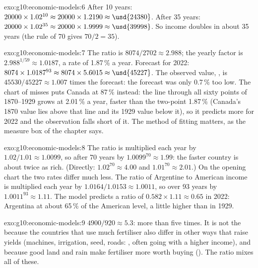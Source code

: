 \begin{solution}{exo:g10:economic-models:6}
After 10 years: $20000 \times 1.02^{10} \approx 20000 \times 1.2190 \approx \usd{24380}$. After 35
years: $20000 \times 1.02^{35} \approx 20000 \times 1.9999 \approx \usd{39998}$. So income doubles in
about 35 years (the rule of 70 gives $70/2 = 35$).
\end{solution}

\begin{solution}{exo:g10:economic-models:7}
The ratio is $8074/2702 \approx 2.988$; the yearly factor is $2.988^{1/59} \approx 1.0187$, a rate of
1.87\,\% a year. Forecast for 2022: $8074 \times 1.0187^{93} \approx 8074 \times 5.6015 \approx
\usd{45227}$. The observed value, , is $45530/45227 \approx 1.007$ times the forecast:
the forecast was only 0.7\,\% too low. The chart of misses puts Canada at 87\,\% instead: the line through
all sixty points of 1870--1929 grows at 2.01\,\% a year, faster than the two-point 1.87\,\% (Canada's
1870 value lies above that line and its 1929 value below it), so it predicts more for 2022 and the observation falls short of it.
The method of fitting matters, as the measure box of the chapter says.
\end{solution}

\begin{solution}{exo:g10:economic-models:8}
The ratio is multiplied each year by $1.02/1.01 \approx 1.0099$, so after 70 years by $1.0099^{70}
\approx 1.99$: the faster country is about twice as rich. (Directly: $1.02^{70} \approx 4.00$ and
$1.01^{70} \approx 2.01$.) On the opening chart the two rates differ much less. The ratio of
Argentine to American income is multiplied each year by $1.0164/1.0153 \approx 1.0011$, so over 93
years by $1.0011^{93} \approx 1.11$. The model predicts a ratio of $0.582 \times 1.11 \approx 0.65$
in 2022: Argentina at about 65\,\% of the American level, a little higher than in 1929.
\end{solution}

\begin{solution}{exo:g10:economic-models:9}
$4900/920 \approx 5.3$: more than five times. It is not the  because the countries that
use much fertiliser also differ in other ways that raise yields (machines, irrigation, seed, roads:
, often going with a higher income), and because good land and rain make
fertiliser more worth buying (). The ratio mixes all of these.
\end{solution}

